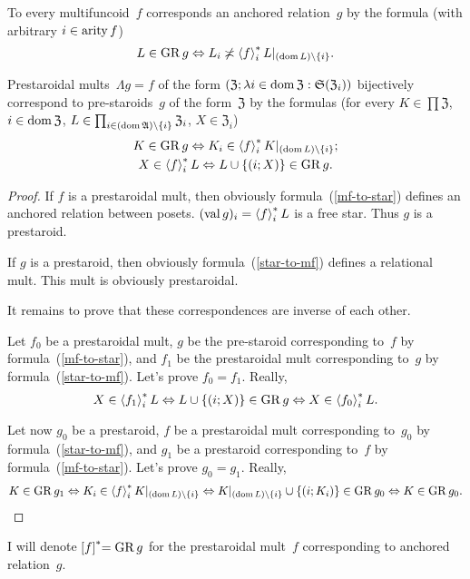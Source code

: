 \begin{defn}
To every multifuncoid~$f$ corresponds an anchored relation~$g$ by the
formula (with arbitrary $i\in\operatorname{arity} f$) 
\[
L\in\operatorname{GR} g\Leftrightarrow L_{i}\not\asymp\left\langle f\right\rangle ^{\ast}_{i}L|_{(\operatorname{dom} L)\setminus\{i\}}.
\]
\end{defn}
\begin{prop}
Prestaroidal mults~$\Lambda g=f$ of the form $(\mathfrak{Z};\lambda i\in\operatorname{dom}\mathfrak{Z}:\mathfrak{S}(\mathfrak{Z}_{i}))$
bijectively correspond to pre-staroids~$g$ of the form~$\mathfrak{Z}$
by the formulas (for every $K\in\prod\mathfrak{Z}$, $i\in\operatorname{dom}\mathfrak{Z}$,
$L\in\prod_{i\in(\operatorname{dom}\mathfrak{A})\setminus\{i\}}\mathfrak{Z}_{i}$,
$X\in\mathfrak{Z}_{i}$)
\begin{gather}
K\in\operatorname{GR} g\Leftrightarrow K_{i}\in\left\langle f\right\rangle ^{\ast}_{i}K|_{(\operatorname{dom} L)\setminus\{i\}};\label{mf-to-star}\\
X\in\left\langle f\right\rangle ^{\ast}_{i}L\Leftrightarrow L\cup\{(i;X)\}\in\operatorname{GR} g.\label{star-to-mf}
\end{gather}
\end{prop}
\begin{proof}
If $f$ is a prestaroidal mult, then obviously formula~(\ref{mf-to-star})
defines an anchored relation between posets. $(\operatorname{val} g)_{i}=\left\langle f\right\rangle ^{\ast}_{i}L$
is a free star. Thus $g$ is a prestaroid.

If $g$ is a prestaroid, then obviously formula~(\ref{star-to-mf})
defines a relational mult. This mult is obviously prestaroidal.

It remains to prove that these correspondences are inverse of each
other.

Let $f_{0}$ be a prestaroidal mult, $g$ be the pre-staroid corresponding
to~$f$ by formula~(\ref{mf-to-star}), and $f_{1}$ be the prestaroidal
mult corresponding to~$g$ by formula~(\ref{star-to-mf}). Let's
prove $f_{0}=f_{1}$. Really, 
\[
X\in\left\langle f_{1}\right\rangle ^{\ast}_{i}L\Leftrightarrow L\cup\{(i;X)\}\in\operatorname{GR} g\Leftrightarrow X\in\left\langle f_{0}\right\rangle ^{\ast}_{i}L.
\]


Let now $g_{0}$ be a prestaroid, $f$ be a prestaroidal mult corresponding
to~$g_{0}$ by formula~(\ref{star-to-mf}), and $g_{1}$ be a prestaroid
corresponding to~$f$ by formula~(\ref{mf-to-star}). Let's prove
$g_{0}=g_{1}$. Really, 
\[
K\in\operatorname{GR} g_{1}\Leftrightarrow K_{i}\in\left\langle f\right\rangle ^{\ast}_{i}K|_{(\operatorname{dom} L)\setminus\{i\}}\Leftrightarrow K|_{(\operatorname{dom} L)\setminus\{i\}}\cup\{(i;K_{i})\}\in\operatorname{GR} g_{0}\Leftrightarrow K\in\operatorname{GR} g_{0}.
\]
\end{proof}
\begin{defn}
I will denote $\mathrel{\left[f\right]^{\ast}}=\operatorname{GR} g$ for the prestaroidal mult~$f$ corresponding to anchored relation~$g$.
\end{defn}

